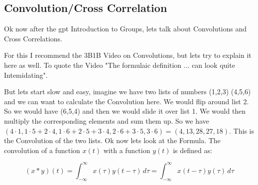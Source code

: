 \documentclass[a4paper]{article}
\begin{document}
\subsection{Convolution/Cross Correlation}
Ok now after the gpt Introduction to Groups, lets talk about Convolutions and Cross Correlations. 

For this I recommend the 3B1B Video on Convolutions, but lets try to explain it here as well. To quote the Video "The formulaic definition ... can look quite Intemidating".

But lets start slow and easy, imagine we have two lists of numbers (1,2,3) (4,5,6) and we can want to calculate the Convolution here. We would flip around list 2. So we would have (6,5,4) and then we would slide it over list 1. We would then multiply the corresponding elements and sum them up. So we have $(4 \cdot 1, 1 \cdot 5 + 2 \cdot 4, 1 \cdot 6 + 2 \cdot 5 + 3 \cdot 4, 
2 \cdot 6 + 3 \cdot 5, 3 \cdot 6) = (4, 13, 28, 27, 18)$. This is the Convolution of the two lists. Ok now lets look at the Formula.
The convolution of a function \( x(t) \) with a function \( y(t) \) is defined as:

\[
(x * y)(t) = \int_{-\infty}^{\infty} x(\tau) y(t - \tau) \, d\tau = \int_{-\infty}^{\infty} x(t - \tau) y(\tau) \, d\tau
\]
 
\end{document}
